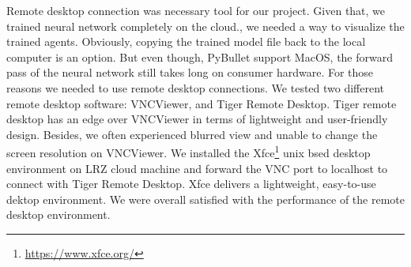 Remote desktop connection was necessary tool for our project. Given that, we trained neural network completely on the cloud., we needed a way to visualize the trained agents. Obviously, copying the trained model file back to the local computer is an option. But even though, PyBullet support MacOS, the forward pass of the neural network still takes long on consumer hardware. For those reasons we needed to use remote desktop connections. We tested two different remote desktop software: VNCViewer, and Tiger Remote Desktop. Tiger remote desktop has an edge over VNCViewer in terms of lightweight and user-friendly design. Besides, we often experienced blurred view and unable to change the screen resolution on VNCViewer. We installed the Xfce\footnote{\url{https://www.xfce.org/}} unix bsed desktop environment on LRZ cloud machine and forward the VNC port to localhost to connect with Tiger Remote Desktop. Xfce delivers a lightweight, easy-to-use dektop environment. We were overall satisfied with the performance of the remote desktop environment. 

